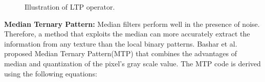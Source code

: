 \begin{figure}[!ht]
	\centering
	 
	 
	\caption{Illustration of LTP operator.}
	\label{fig:ltp}
	\vspace{-4mm}
\end{figure}

\noindent \textbf{Median Ternary Pattern:} Median filters perform well in the
presence of noise. Therefore, a method that exploits the median can more
accurately extract the information from any texture than the local binary patterns.
Bashar et al. \cite{bashar2014robust} proposed Median Ternary Pattern(MTP) that
combines the advantages of median and quantization of the pixel's gray scale
value. The MTP code is derived using the following equations:

